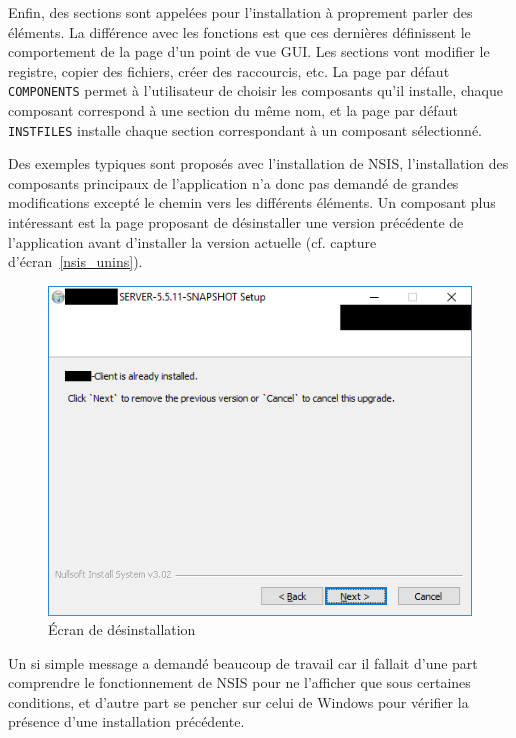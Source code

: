 Enfin, des sections sont appelées pour l'installation à proprement parler des éléments. La différence avec les fonctions est que ces dernières définissent le comportement de la page d'un point de vue GUI. Les sections vont modifier le registre, copier des fichiers, créer des raccourcis, etc. La page par défaut \verb|COMPONENTS| permet à l'utilisateur de choisir les composants qu'il installe, chaque composant correspond à une section du même nom, et la page par défaut \verb|INSTFILES| installe chaque section correspondant à un composant sélectionné. 

Des exemples typiques sont proposés avec l'installation de NSIS, l'installation des composants principaux de l'application n'a donc pas demandé de grandes modifications excepté le chemin vers les différents éléments. Un composant plus intéressant est la page proposant de désinstaller une version précédente de l'application avant d'installer la version actuelle (cf. capture d'écran~\ref{nsis_unins}).

\begin{figure}
    \centering
    \caption{Écran de désinstallation}
	\label{fig:nsis_unins}
    \includegraphics[width=\textwidth]{images/nsis_uninstall}
\end{figure}

Un si simple message a demandé beaucoup de travail car il fallait d'une part comprendre le fonctionnement de NSIS pour ne l'afficher que sous certaines conditions, et d'autre part se pencher sur celui de Windows pour vérifier la présence d'une installation précédente.

